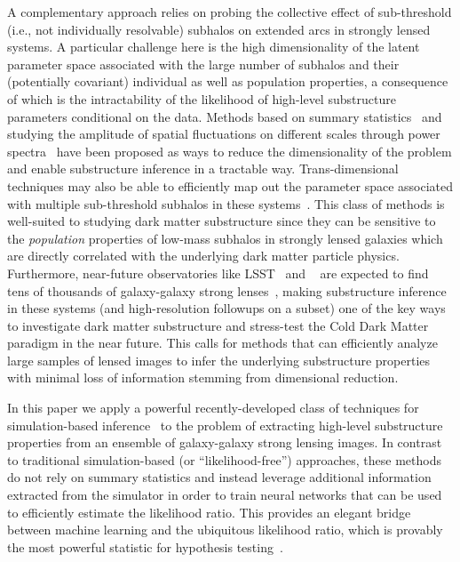 \documentclass[twocolumn]{aastex62}
\begin{document}
A complementary approach relies on probing the collective effect of sub-threshold (i.e., not individually resolvable) subhalos on extended arcs in strongly lensed systems. A particular challenge here is the high dimensionality of the latent parameter space associated with the large number of subhalos and their (potentially covariant) individual as well as population properties, a consequence of which is the intractability of the likelihood of high-level substructure parameters conditional on the data. Methods based on summary statistics~\citep{1702.00009} and studying the amplitude of spatial fluctuations on different scales through power spectra~\citep{1403.2720,1809.00004,1707.04590,1806.07897,1808.03501,1710.03075,1506.01724} have been proposed as ways to reduce the dimensionality of the problem and enable substructure inference in a tractable way. Trans-dimensional techniques may also be able to efficiently map out the parameter space associated with multiple sub-threshold subhalos in these systems~\citep{1508.00662,1706.06111}. This class of methods is well-suited to studying dark matter substructure since they can be sensitive to the \emph{population} properties of low-mass subhalos in strongly lensed galaxies which are directly correlated with the underlying dark matter particle physics. Furthermore, near-future observatories like LSST~\citep{0912.0201,2019arXiv190201055D,1902.05141} and \Euclid~\citep{1001.0061} are expected to find tens of thousands of galaxy-galaxy strong lenses~\citep{2015ApJ...811...20C}, making substructure inference in these systems (and high-resolution followups on a subset) one of the key ways to investigate dark matter substructure and stress-test the Cold Dark Matter paradigm in the near future. This calls for methods that can efficiently analyze large samples of lensed images to infer the underlying substructure properties with minimal loss of information stemming from dimensional reduction.

In this paper we apply a powerful recently-developed class of techniques for simulation-based inference~\citep{1805.00013,1805.00020,1805.12244} to the problem of extracting high-level substructure properties from an ensemble of galaxy-galaxy strong lensing images. In contrast to traditional simulation-based (or ``likelihood-free'') approaches, these methods do not rely on summary statistics and instead leverage additional information extracted from the simulator in order to train neural networks that can be used to efficiently estimate the likelihood ratio. This provides an elegant bridge between machine learning and the ubiquitous likelihood ratio, which is provably the most powerful statistic for hypothesis testing~\citep{1933RSPTA.231..289N}.
\end{document}
